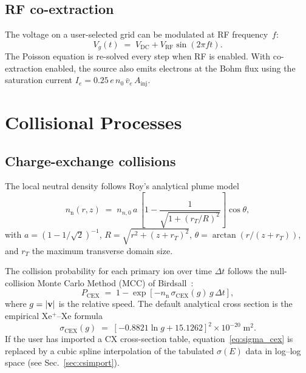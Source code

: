 \documentclass[11pt,a4paper]{article}
\begin{document}
\subsection{RF co-extraction}

The voltage on a user-selected grid can be modulated at RF
frequency~\(f\):
\begin{equation}
    V_{g}(t) \;=\; V_{\mathrm{DC}} + V_{\mathrm{RF}}\sin(2\pi f t).
\end{equation}
The Poisson equation is re-solved every step when RF is enabled.
With co-extraction enabled, the source also emits electrons at the
Bohm flux using the saturation current
\(I_{e}=0.25\,e\,n_{0}\,\bar{v}_{e}\,A_{\mathrm{inj}}\).

\section{Collisional Processes}

\subsection{Charge-exchange collisions}

The local neutral density follows Roy's analytical plume model
\begin{equation}
    n_{\mathrm{n}}(r,z) \;=\; n_{n,0}\,a\,
    \left[1 - \frac{1}{\sqrt{1+(r_{T}/R)^{2}}}\right]
    \cos\theta,
    \label{eq:roy}
\end{equation}
with \(a=(1-1/\sqrt{2})^{-1}\),
\(R=\sqrt{r^{2}+(z+r_{T})^{2}}\),
\(\theta=\arctan(r/(z+r_{T}))\), and \(r_{T}\) the maximum
transverse domain size.

The collision probability for each primary ion over time \(\Delta t\)
follows the null-collision Monte Carlo Method (MCC) of
Birdsall~\cite{birdsall}:
\begin{equation}
    P_{\mathrm{CEX}} \;=\; 1-\exp\!\left[-n_{\mathrm{n}}\,
       \sigma_{\mathrm{CEX}}(g)\,g\,\Delta t\right],
    \label{eq:mcc}
\end{equation}
where \(g=\abs{\vb{v}}\) is the relative speed.  The default
analytical cross section is the empirical Xe\(^{+}\)--Xe formula
\begin{equation}
    \sigma_{\mathrm{CEX}}(g) \;=\;
    \left[-0.8821\ln g + 15.1262\right]^{2}\times 10^{-20}\;\si{\meter\squared}.
    \label{eq:sigma_cex}
\end{equation}
If the user has imported a CX cross-section table,
equation~\eqref{eq:sigma_cex} is replaced by a cubic spline
interpolation of the tabulated \(\sigma(E)\) data in log--log
space (see Sec.~\ref{sec:csimport}).
\end{document}
